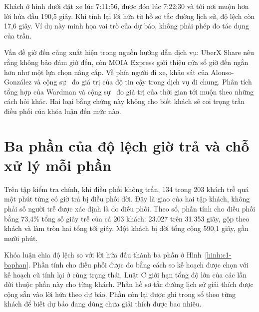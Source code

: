 Khách ở hình dưới đặt xe lúc 7:11:56, được đón lúc 7:22:30 và tới nơi muộn hơn lời hứa đầu 190,5 giây.
Khi tính lại lời hứa từ hồ sơ tắc đường lịch sử, độ lệch còn 17,6 giây. Ví dụ này minh họa vai trò của dự báo,
không phải phép đo tác dụng của trần.

Vấn đề giờ đến cũng xuất hiện trong nguồn hướng dẫn dịch vụ: UberX Share nêu rằng không bảo đảm giờ đến,
còn MOIA Express giới thiệu cửa sổ giờ đến ngắn hơn như một lựa chọn nâng cấp. Về phía người đi xe, khảo sát của
Alonso-González và cộng sự~\cite{alonsogonzalez2020} đo giá trị của độ tin cậy trong dịch vụ đi chung.
Phân tích tổng hợp của Wardman và cộng sự~\cite{wardman2026} đo giá trị của thời gian tới muộn theo những cách hỏi khác.
Hai loại bằng chứng này không cho biết khách sẽ coi trọng trần điều phối của khóa luận đến mức nào.

\section{Ba phần của độ lệch giờ trả và chỗ xử lý mỗi phần}
\label{muc:c1-cauhoi}

Trên tập kiểm tra chính, khi điều phối không trần, 134 trong 203 khách trễ quá một phút từng có giờ trả bị
điều phối dời. Đây là giao của hai tập khách, không phải số người trễ được xác định là do điều phối.
Theo sổ, phần tính cho điều phối bằng 73,4\% tổng số giây trễ của cả 203 khách: 23.027 trên 31.353 giây,
gộp theo khách và làm tròn hai tổng tới giây. Một khách bị dời tổng cộng 590,1 giây, gần mười phút.

Khóa luận chia độ lệch so với lời hứa đầu thành ba phần ở Hình~\ref{hinh:c1-baphan}. Phần tính cho điều phối
được đo bằng cách so kế hoạch được chọn với kế hoạch cũ tính lại ở cùng trạng thái. Luật C giới hạn tổng độ lớn
của các lần dời thuộc phần này cho từng khách. Phần hồ sơ tắc đường lịch sử giải thích được cộng sẵn vào lời hứa
theo dự báo. Phần còn lại được ghi trong sổ theo từng khách để biết dự báo đang dùng chưa giải thích được bao nhiêu.

